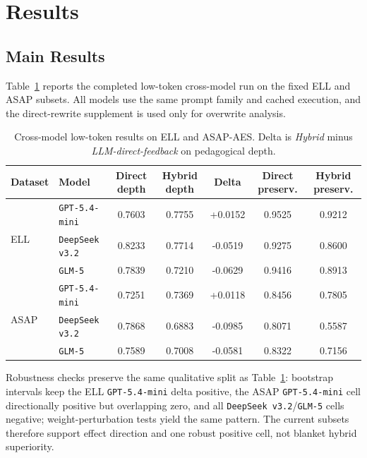 \documentclass[preprint,12pt]{elsarticle}
\begin{document}
\section{Results}

\subsection{Main Results}

Table~\ref{tab:main_results} reports the completed low-token cross-model run on the fixed ELL and ASAP subsets. All models use the same prompt family and cached execution, and the direct-rewrite supplement is used only for overwrite analysis.

\begin{table}[t]
\centering
\scriptsize
\caption{Cross-model low-token results on ELL and ASAP-AES. Delta is \textit{Hybrid} minus \textit{LLM-direct-feedback} on pedagogical depth.}
\label{tab:main_results}
\begin{tabular*}{\linewidth}{@{\extracolsep{\fill}}llccccc@{}}
\toprule
Dataset & Model & Direct depth & Hybrid depth & Delta & Direct preserv. & Hybrid preserv. \\
\midrule
\multirow{3}{*}{ELL} & \texttt{GPT-5.4-mini} & 0.7603 & 0.7755 & +0.0152 & 0.9525 & 0.9212 \\
 & \texttt{DeepSeek v3.2} & 0.8233 & 0.7714 & -0.0519 & 0.9275 & 0.8600 \\
 & \texttt{GLM-5} & 0.7839 & 0.7210 & -0.0629 & 0.9416 & 0.8913 \\
\midrule
\multirow{3}{*}{ASAP} & \texttt{GPT-5.4-mini} & 0.7251 & 0.7369 & +0.0118 & 0.8456 & 0.7805 \\
 & \texttt{DeepSeek v3.2} & 0.7868 & 0.6883 & -0.0985 & 0.8071 & 0.5587 \\
 & \texttt{GLM-5} & 0.7589 & 0.7008 & -0.0581 & 0.8322 & 0.7156 \\
\bottomrule
\end{tabular*}
\end{table}

Robustness checks preserve the same qualitative split as Table~\ref{tab:main_results}: bootstrap intervals keep the ELL \texttt{GPT-5.4-mini} delta positive, the ASAP \texttt{GPT-5.4-mini} cell directionally positive but overlapping zero, and all \texttt{DeepSeek v3.2}/\texttt{GLM-5} cells negative; weight-perturbation tests yield the same pattern. The current subsets therefore support effect direction and one robust positive cell, not blanket hybrid superiority.
\end{document}
